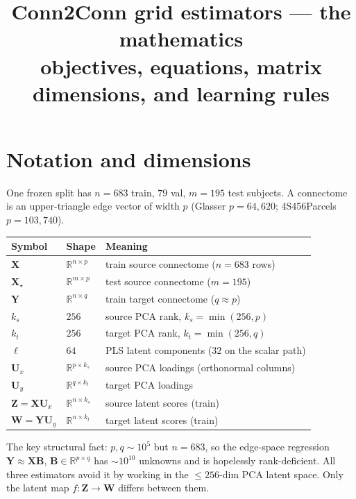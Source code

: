 \documentclass[11pt]{article}
\title{\textbf{Conn2Conn grid estimators --- the mathematics}\\[2pt]
\large objectives, equations, matrix dimensions, and learning rules}
\date{}
\newcommand{\R}{\mathbb{R}}
\newcommand{\Xtr}{\mathbf{X}}
\newcommand{\Ytr}{\mathbf{Y}}
\newcommand{\Z}{\mathbf{Z}}
\newcommand{\W}{\mathbf{W}}
\begin{document}
\maketitle

\section{Notation and dimensions}\label{sec:notation}

One frozen split has $n=683$ train, $79$ val, $m=195$ test subjects. A connectome is an
upper-triangle edge vector of width $p$ (Glasser $p=64{,}620$; 4S456Parcels $p=103{,}740$).

\begin{center}
\renewcommand{\arraystretch}{1.25}
\begin{tabular}{@{}lll@{}}
\toprule
Symbol & Shape & Meaning \\
\midrule
$\Xtr$            & $\R^{n\times p}$    & train source connectome ($n{=}683$ rows) \\
$\Xtr_\star$      & $\R^{m\times p}$    & test source connectome ($m{=}195$) \\
$\Ytr$            & $\R^{n\times q}$    & train target connectome ($q\!\approx\!p$) \\
$k_s$             & $256$               & source PCA rank, $k_s=\min(256,p)$ \\
$k_t$             & $256$               & target PCA rank, $k_t=\min(256,q)$ \\
$\ell$            & $64$                & PLS latent components ($32$ on the scalar path) \\
$\mathbf{U}_x$    & $\R^{p\times k_s}$  & source PCA loadings (orthonormal columns) \\
$\mathbf{U}_y$    & $\R^{q\times k_t}$  & target PCA loadings \\
$\Z=\Xtr\mathbf{U}_x$ & $\R^{n\times k_s}$ & source latent scores (train) \\
$\W=\Ytr\mathbf{U}_y$ & $\R^{n\times k_t}$ & target latent scores (train) \\
\bottomrule
\end{tabular}
\end{center}

\noindent
The key structural fact: $p,q\sim10^5$ but $n=683$, so the edge-space regression
$\Ytr\approx\Xtr\mathbf{B}$, $\mathbf{B}\in\R^{p\times q}$ has $\sim10^{10}$ unknowns and is
hopelessly rank-deficient. All three estimators avoid it by working in the $\le256$-dim PCA
latent space. Only the latent map $f:\Z\!\to\!\W$ differs between them.
\end{document}
